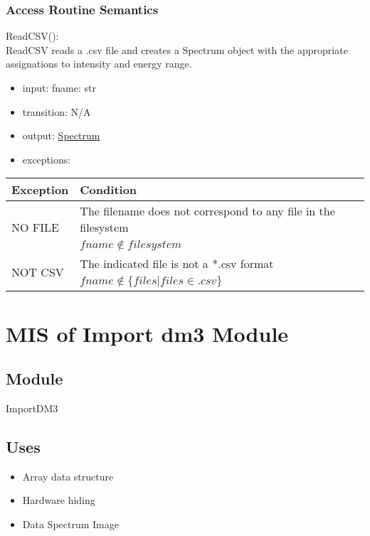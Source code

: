 \documentclass[12pt, titlepage]{article}
\begin{document}
\subsubsection{Access Routine Semantics}

\noindent ReadCSV():\\
ReadCSV reads a .csv file and creates a Spectrum object with the appropriate assignations to intensity and energy range.
\begin{itemize}
	\item input: fname: str
	\item transition: N/A 
	\item output: \hyperref[Mod:Spectrum]{Spectrum}
	\item exceptions:
\end{itemize}
\begin{center}
	\begin{tabular}{p{3cm} p{12cm}}
		\toprule[0.15em]
		\textbf{Exception} & \textbf{Condition}\\
		\midrule[0.1em]
		\multirow{2}{0.25\textwidth}{NO FILE} & The filename does not correspond to any file in the filesystem\\ 
		& $fname \notin filesystem$\\ 
		\midrule[0.05em]
		\multirow{2}{0.25\textwidth}{NOT CSV} & The indicated file is not a *.csv format\\
		& $fname \notin \{files|files \in .csv\}$\\ 
		
		\bottomrule[0.15em]
	\end{tabular}
\end{center}


\section{MIS of Import dm3 Module} \label{Mod:ImportDM3}

\subsection{Module}

ImportDM3

\subsection{Uses}
\begin{itemize}
	\item Array data structure
	\item Hardware hiding
	\item Data Spectrum Image
\end{itemize}
\end{document}
